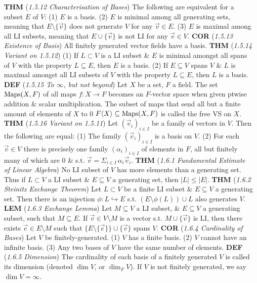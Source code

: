 \documentclass{article}
\newcommand{\wde}[1]{\textcolor{defc}{\textbf{DEF}} (\textcolor{namec}{\textit{#1}})}
\newcommand{\wl}[1]{\textcolor{lemc}{\textbf{LEM}} (\textcolor{namec}{\textit{#1}})}
\newcommand{\wc}[1]{\textcolor{corc}{\textbf{COR}} (\textcolor{namec}{\textit{#1}})}
\newcommand{\wt}[1]{\textcolor{thmc}{\textbf{THM}} (\textcolor{namec}{\textit{#1}})}
\begin{document}
\begin{multicols}{2}
  \wt{1.5.12 Characterisation of Bases} The following are equivalent for a subset $E$ of $V$:
  (1) $E$ is a basis.
  (2) $E$ is minimal among all generating sets, meaning that $E \setminus \{\vec{v}\}$ does not generate $V$ for any $\vec{v} \in E$.
  (3) $E$ is maximal among all LI subsets, meaning that $E \cup \{\vec{v}\}$ is not LI for any $\vec{v} \in V$.
  \wc{1.5.13 Existence of Basis} All finitely generated vector fields have a basis.
  \wt{1.5.14 Variant on 1.5.12}
  (1) If $L \subset V$ is a LI subset \& $E$ is minimal amongst all spans of $V$ with the property $L \subseteq E$, then $E$ is a basis.
  (2) If $E \subseteq V$ spans $V$ \& $L$ is maximal amongst all LI subsets of $V$ with the property $L \subseteq E$, then $L$ is a basis.
  \wde{1.5.15 To $\infty$, but not beyond} Let $X$ be a set, $F$ a field. The set $\text{Maps}(X,F)$ of all maps $f : X \to F$ becomes an $F$-vector space when given ptwise addition \& scalar multiplication. The subset of maps that send all but a finite amount of elements of $X$ to 0 $F \langle X \rangle \subseteq \text{Maps}(X, F)$ is called the free VS on $X$.
  \wt{1.5.16 Variant on 1.5.11} Let $(\vec{v}_{i})_{i \in I}$ be a family of vectors in $V$. Then the following are equal:
  (1) The family $(\vec{v}_{i})_{i \in I}$ is a basis on $V$.
  (2) For each $\vec{v} \in V$ there is precisely one family $(\alpha_{i})_{i \in I}$ of elements in $F$, all but finitely many of which are 0 \& s.t. $\vec{v} = \Sigma_{i \in I} \, \alpha_{i}\vec{v}_{i}$.
  \wt{1.6.1 Fundamental Estimate of Linear Algebra} No LI subset of $V$ has more elements than a generating set. Thus if $L \subset V$ a LI subset \& $E \subseteq V$ a generating set, then $|L| \le |E|$.
  \wt{1.6.2 Steinitz Exchange Theorem} Let $L \subset V$ be a finite LI subset \& $E \subseteq V$ a generating set. Then there is an injection $\phi : L \hookrightarrow E$ s.t. $(E \setminus \phi(L)) \cup L$ also generates $V$.
  \wl{1.6.3 Exchange Lemma} Let $M \subseteq V$ a LI subset, \& $E \subseteq V$ a generating subset, such that $M \subseteq E$. If $\vec{v} \in V \setminus M$ is a vector s.t. $M \cup \{\vec{v}\}$ is LI, then there exists $\vec{e} \in E \setminus M$ such that $\{E \setminus \{\vec{e}\}\} \cup \{\vec{v}\}$ spans $V$.
  \wc{1.6.4 Cardinality of Bases} Let $V$ be finitely-generated.
  (1) $V$ has a finite basis.
  (2) $V$ cannot have an infinite basis.
  (3) Any two bases of $V$ have the same number of elements.
  \wde{1.6.5 Dimension} The cardinality of each basis of a finitely generated $V$ is called its dimension (denoted $\dim V$, or $\dim_{F}V$). If $V$ is not finitely generated, we say $\dim V = \infty$.

\end{multicols}
\end{document}
